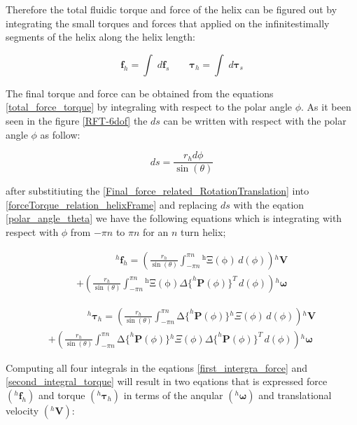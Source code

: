 \documentclass[12pt,a4paper,titlepage]{report}
\begin{document}
Therefore the total fluidic torque and force of the helix can be figured out by integrating the small torques
and forces that applied on the infinitestimally segments of the helix along the helix length:

\begin{equation}
 \bm{f}_h = \int \; d\bm{f}_s  \qquad  \bm{\tau}_h = \int \; d\bm{\tau}_s 
\label{total_force_torque}
\end{equation} 
 
The final torque and force can be obtained from the equations \ref{total_force_torque} by 
integraling with respect to the polar angle $\phi$. As it been seen in the figure \ref{RFT-6dof} the $ds$
can be written with respect with the polar angle $\phi$ as follow:


\begin{equation}
ds = \frac{r_hd\phi}{\sin(\theta)}
\label{polar_angle_theta}
\end{equation} 

after substitiuting the \ref{Final_force_related_RotationTranslation} into \ref{forceTorque_relation_helixFrame} and 
replacing $ds$ with the eqation \ref{polar_angle_theta} we have the following equations which is 
integrating with respect with $\phi$ from $-\pi n$ to $\pi n$ for an $n$ turn helix;

 
\begin{multline}
\qquad \qquad^{h}\bm{f}_h = \left (  \frac{r_h}{\sin(\theta)}  \int _{-\pi n}^{\pi n} \mathrm {^{h}\Xi(\phi)}\, d(\phi)  \right){^{h}{\bm{V}}} \\ 
+ \left ( \frac{r_h}{\sin(\theta)}  \int _{-\pi n}^{\pi n} \mathrm {^{h}\Xi(\phi)}  \Delta{\{^{h}\bm{P}(\phi)}\}^T    \, d(\phi)    \right){^{h}{\bm{\omega}}}
\label{first_intergra_force}
\end{multline} 


\begin{multline}
\qquad \qquad ^{h}\bm{\tau}_h = \left (  \frac{r_h}{\sin(\theta)}  \int _{-\pi n}^{\pi n} \mathrm \Delta{\{^{h}\bm{P}(\phi)}\} {^{h}\Xi(\phi)}\, d(\phi) \right){^{h}{\bm{V}}} \\
 + \left ( \frac{r_h}{\sin(\theta)} \int _{-\pi n}^{\pi n} \mathrm \Delta{\{^{h}\bm{P}(\phi)}\} {^{h}\Xi(\phi)} \Delta{\{^{h}\bm{P}(\phi)}\}^T \, d(\phi) \right){^{h}{\bm{\omega}}}
\label{second_integral_torque}
\end{multline} 

Computing all four integrals in the eqations \ref{first_intergra_force} and \ref{second_integral_torque} will
result in two eqations that is expressed force $(^{h}\bm{f}_h)$ and torque $(^{h}\bm{\tau}_h)$ in 
terms of the anqular $(^{h}\bm{\omega})$ and translational velocity $(^{h}\bm{V})$: 
\end{document}
